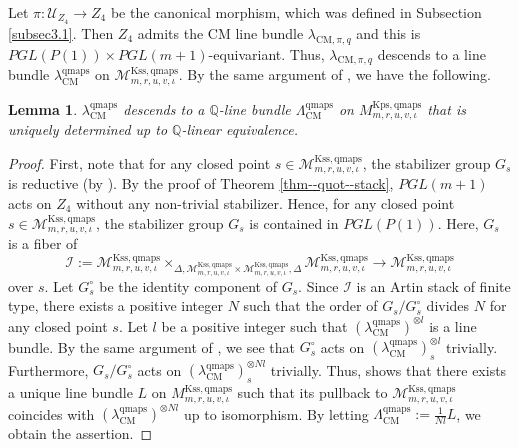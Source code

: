 \documentclass[12pt,twoside]{amsart}
\newtheorem{lem}[thm]{Lemma}
\theoremstyle{definition}
\begin{document}
Let $\pi\colon \mathcal{U}_{Z_4}\to Z_4$ be the canonical morphism, which was defined in Subsection \ref{subsec3.1}.
Then $Z_4$ admits the CM line bundle $\lambda_{\mathrm{CM},\pi,q}$ and this is $PGL(P(1))\times PGL(m+1)$-equivariant. 
Thus, $\lambda_{\mathrm{CM},\pi,q}$ descends to a line bundle $\lambda^{\mathrm{qmaps}}_{\mathrm{CM}}$ on $\mathcal{M}^{\mathrm{Kss,qmaps}}_{m,r,u,v,\iota}$.
By the same argument of \cite[Lemma 10.2]{CP}, we have the following.
\begin{lem}\label{lem--CM--descent}
    $\lambda^{\mathrm{qmaps}}_{\mathrm{CM}}$ descends to a $\mathbb{Q}$-line bundle $\Lambda^{\mathrm{qmaps}}_{\mathrm{CM}}$ on $M^{\mathrm{Kps,qmaps}}_{m,r,u,v,\iota}$ that is uniquely determined up to $\mathbb{Q}$-linear equivalence.
\end{lem}

\begin{proof}
First, note that for any closed point $s\in \mathcal{M}^{\mathrm{Kss,qmaps}}_{m,r,u,v,\iota}$, the stabilizer group $G_s$ is reductive (by \cite[Proposition 12.14]{alper}).
    By the proof of Theorem \ref{thm--quot--stack}, $PGL(m+1)$ acts on $Z_4$ without any non-trivial stabilizer. 
    Hence, for any closed point $s\in \mathcal{M}^{\mathrm{Kss,qmaps}}_{m,r,u,v,\iota}$, the stabilizer group $G_s$ is contained in $PGL(P(1))$.
    Here, $G_s$ is a fiber of 
    $$\mathcal{I}:=\mathcal{M}^{\mathrm{Kss,qmaps}}_{m,r,u,v,\iota}\times_{\Delta,\mathcal{M}^{\mathrm{Kss,qmaps}}_{m,r,u,v,\iota}\times\mathcal{M}^{\mathrm{Kss,qmaps}}_{m,r,u,v,\iota},\Delta}\mathcal{M}^{\mathrm{Kss,qmaps}}_{m,r,u,v,\iota}\to \mathcal{M}^{\mathrm{Kss,qmaps}}_{m,r,u,v,\iota}$$ over $s$.
    Let $G_{s}^\circ$ be the identity component of $G_s$.
    Since $\mathcal{I}$ is an Artin stack of finite type, there exists a positive integer $N$ such that the order of $G_s/G_{s}^\circ$ divides $N$ for any closed point $s$.
    Let $l$ be a positive integer such that $(\lambda^{\mathrm{qmaps}}_{\mathrm{CM}})^{\otimes l}$ is a line bundle.
    By the same argument of \cite[Lemma 10.2]{CP}, we see that $G_{s}^\circ$ acts on $(\lambda^{\mathrm{qmaps}}_{\mathrm{CM}})^{\otimes l}_s$ trivially.
    Furthermore, $G_s/G_{s}^\circ$ acts on $(\lambda^{\mathrm{qmaps}}_{\mathrm{CM}})^{\otimes Nl}_s$ trivially.
    Thus, \cite[Theorem 10.3]{alper} shows that there exists a unique line bundle  $L$ on $M^{\mathrm{Kss,qmaps}}_{m,r,u,v,\iota}$ such that its pullback to $\mathcal{M}^{\mathrm{Kss,qmaps}}_{m,r,u,v,\iota}$ coincides with $(\lambda^{\mathrm{qmaps}}_{\mathrm{CM}})^{\otimes Nl}$ up to isomorphism.
    By letting $\Lambda^{\mathrm{qmaps}}_{\mathrm{CM}}:=\frac{1}{Nl}L$, we obtain the assertion.
\end{proof}
\end{document}
